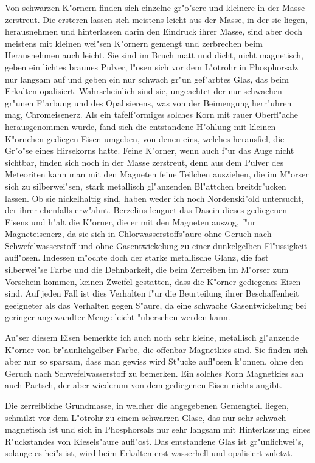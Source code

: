 \documentclass[a4paper, 11pt, oneside]{article}
\begin{document}
Von schwarzen K"ornern finden sich einzelne gr"o"sere und kleinere in der Masse zerstreut. Die ersteren lassen sich meistens leicht aus der Masse, in der sie liegen, herausnehmen und hinterlassen darin den Eindruck ihrer Masse, sind aber doch meistens mit kleinen wei"sen K"ornern gemengt und zerbrechen beim Herausnehmen auch leicht. Sie sind im Bruch matt und dicht, nicht magnetisch, geben ein lichtes braunes Pulver, l"osen sich vor dem L"otrohr in Phosphorsalz nur langsam auf und geben ein nur schwach gr"un gef"arbtes Glas, das beim Erkalten opalisiert. Wahrscheinlich sind sie, ungeachtet der nur schwachen gr"unen F"arbung und des Opalisierens, was von der Beimengung herr"uhren mag, Chromeisenerz. Als ein tafelf"ormiges solches Korn mit rauer Oberfl"ache herausgenommen wurde, fand sich die entstandene H"ohlung mit kleinen K"ornchen gediegen Eisen umgeben, von denen eins, welches herausfiel, die Gr"o"se eines Hirsekorns hatte. Feine K"orner, wenn auch f"ur das Auge nicht sichtbar, finden sich noch in der Masse zerstreut, denn aus dem Pulver des Meteoriten kann man mit den Magneten feine Teilchen ausziehen, die im M"orser sich zu silberwei"sen, stark metallisch gl"anzenden Bl"attchen breitdr"ucken lassen. Ob sie nickelhaltig sind, haben weder ich noch Nordenski"old untersucht, der ihrer ebenfalls erw"ahnt. Berzelius leugnet das Dasein dieses gediegenen Eisens und h"alt die K"orner, die er mit den Magneten auszog, f"ur Magneteisenerz, da sie sich in Chlorwasserstoffs"aure ohne Geruch nach Schwefelwasserstoff und ohne Gasentwickelung zu einer dunkelgelben Fl"ussigkeit aufl"osen. Indessen m"ochte doch der starke metallische Glanz, die fast silberwei"se Farbe und die Dehnbarkeit, die beim Zerreiben im M"orser zum Vorschein kommen, keinen Zweifel gestatten, dass die K"orner gediegenes Eisen sind. Auf jeden Fall ist dies Verhalten f"ur die Beurteilung ihrer Beschaffenheit geeigneter als das Verhalten gegen S"aure, da eine schwache Gasentwickelung bei geringer angewandter Menge leicht "ubersehen werden kann.

Au"ser diesem Eisen bemerkte ich auch noch sehr kleine, metallisch gl"anzende K"orner von br"aunlichgelber Farbe, die offenbar Magnetkies sind. Sie finden sich aber nur so sparsam, dass man gewiss wird St"ucke aufl"osen k"onnen, ohne den Geruch nach Schwefelwasserstoff zu bemerken. Ein solches Korn Magnetkies sah auch Partsch, der aber wiederum von dem gediegenen Eisen nichts angibt.

Die zerreibliche Grundmasse, in welcher die angegebenen Gemengteil liegen, schmilzt vor dem L"otrohr zu einem schwarzen Glase, das nur sehr schwach magnetisch ist und sich in Phosphorsalz nur sehr langsam mit Hinterlassung eines R"uckstandes von Kiesels"aure aufl"ost. Das entstandene Glas ist gr"unlichwei"s, solange es hei"s ist, wird beim Erkalten erst wasserhell und opalisiert zuletzt.
\end{document}
